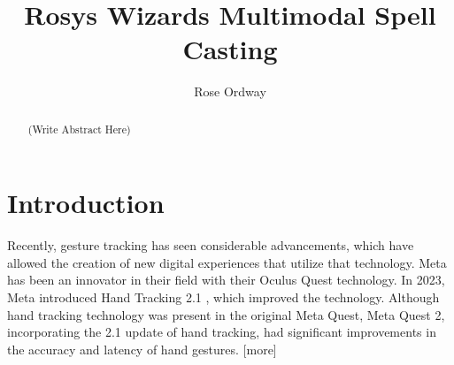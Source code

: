 \documentclass[acmlarge]{acmart}
\begin{document}
\title{Rosys Wizards Multimodal Spell Casting}

\author{Rose Ordway}

\begin{abstract}
 (Write Abstract Here)
\end{abstract}

\begin{CCSXML}
\end{CCSXML}




\maketitle 

\section{Introduction}
Recently, gesture tracking has seen considerable advancements, which have allowed the creation of new digital experiences that utilize that technology. Meta has been an innovator in their field with their Oculus Quest technology. In 2023, Meta introduced Hand Tracking 2.1 \cite{MetaDevelopers_2023}, which improved the technology. Although hand tracking technology was present in the original Meta Quest, Meta Quest 2, incorporating the 2.1 update of hand tracking, had significant improvements in the accuracy and latency of hand gestures. [more]
\end{document}
